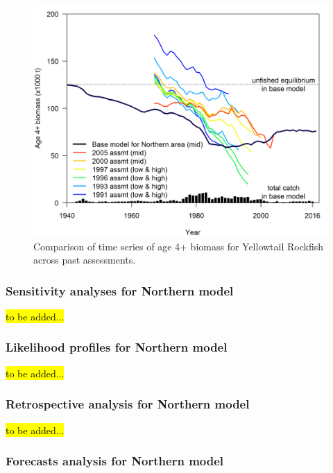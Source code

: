 \documentclass[12pt,]{article}
\begin{document}
\FloatBarrier

\begin{figure}[htbp]
\centering
\includegraphics{Figures/historical_assessment_timeseries.png}
\caption{Comparison of time series of age 4+ biomass for Yellowtail
Rockfish across past assessments. \label{fig:assessment_history}}
\end{figure}

\FloatBarrier

\newpage

\subsubsection{Sensitivity analyses for Northern
model}\label{sensitivity-analyses-for-northern-model}

\hl{to be added...}

\subsubsection{Likelihood profiles for Northern
model}\label{likelihood-profiles-for-northern-model}

\hl{to be added...}

\subsubsection{Retrospective analysis for Northern
model}\label{retrospective-analysis-for-northern-model}

\hl{to be added...}

\subsubsection{Forecasts analysis for Northern
model}\label{forecasts-analysis-for-northern-model}
\end{document}
